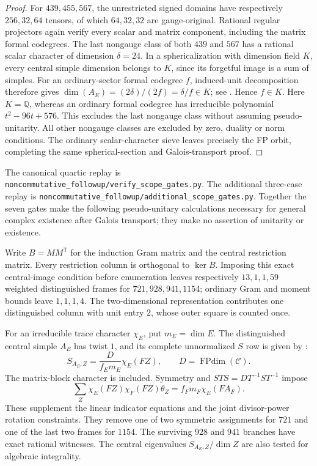 \begin{proof}
For $439,455,567$, the unrestricted signed domains have respectively
$256,32,64$ tensors, of which $64,32,32$ are gauge-original. Rational
regular projectors again verify every scalar and matrix component,
including the matrix formal codegrees. The last nongauge class of both
$439$ and $567$ has a rational scalar character of dimension $\delta=24$.
In a sphericalization with dimension field $K$, every central simple
dimension belongs to $K$, since its forgetful image is a sum of simples.
For an ordinary-sector formal codegree $f$, induced-unit decomposition
therefore gives $\dim(A_E)=(2\delta)/(2f)=\delta/f\in K$; see
\cite[Theorem~2.13 and Corollary~2.15]{OstrikPiv3}. Hence $f\in K$.
Here $K=\mathbb Q$, whereas an ordinary formal codegree has irreducible
polynomial $t^2-96t+576$. This excludes the last nongauge class without
assuming pseudo-unitarity. All other nongauge classes are excluded by
zero, duality or norm conditions. The ordinary scalar-character sieve
leaves precisely the FP orbit, completing the same spherical-section
and Galois-transport proof.
\end{proof}

The canonical quartic replay is
\texttt{noncommutative\_followup/verify\_scope\_gates.py}.
The additional three-case replay is
\texttt{noncommutative\_followup/additional\_scope\_gates.py}.
Together the seven gates make the following pseudo-unitary calculations
necessary for general complex existence after Galois transport; they
make no assertion of unitarity or existence.

Write $B=MM^{\mathsf T}$ for the induction Gram matrix and the central
restriction matrix. Every restriction column is orthogonal to
$\ker B$. Imposing this exact central-image condition before enumeration
leaves respectively $13,1,1,59$ weighted distinguished frames for
$721,928,941,1154$; ordinary Gram and moment bounds leave $1,1,1,4$.
The two-dimensional representation contributes one distinguished column
with unit entry $2$, whose outer square is counted once.

For an irreducible trace character $\chi_E$, put $m_E=\dim E$.
The distinguished central simple $A_E$ has twist $1$, and its complete
unnormalized $S$ row is given by \cite[Equation~(39)]{DeshpandeCenter}:
\[
 S_{A_E,Z}=\frac{D}{f_E m_E}\chi_E(FZ),\qquad D=\operatorname{FPdim}(\mathcal C).
\]
The matrix-block character is included. Symmetry and
$STS=DT^{-1}ST^{-1}$ impose
\[
 \sum_Z\chi_E(FZ)\chi_F(FZ)\theta_Z
 =f_Fm_F\chi_E(FA_F).
\]
These supplement the linear indicator equations and the joint
divisor-power rotation constraints. They remove one of two symmetric
assignments for $721$ and one of the last two frames for $1154$.
The surviving $928$ and $941$ branches have exact rational witnesses.
The central eigenvalues $S_{A_E,Z}/\dim Z$ are also tested for algebraic
integrality.

